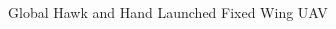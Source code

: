 \documentclass[numbered,pdftex]{ohio-etd}
\begin{document}

\begin{figure}[H]
	\begin{subfigmatrix}{2}%
		\centering
		\hspace*{0mm}
	\end{subfigmatrix}
	\caption{Global Hawk and Hand Launched Fixed Wing UAV}
	\label{fig:fixedwings}
\end{figure}
\end{document}
